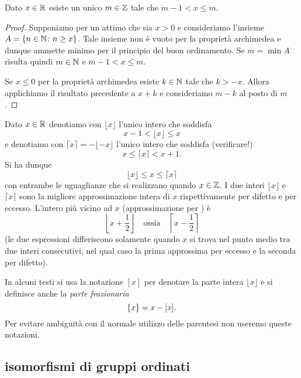 \begin{theorem}
\mymark{*}%
  Dato $x\in {\mathbb R}$ esiste un unico $m\in {\mathbb Z}$ tale che $m-1 < x \le m$.
\end{theorem}
%
\begin{proof}
  Supponiamo per un attimo che sia $x > 0$
  e consideriamo l'insieme $A={\left\{ n \in {\mathbb N} \colon n\ge x \right\}}$.
  Tale insieme non è vuoto per la proprietà archimedea 
  e dunque ammette minimo per il principio del buon ordinamento.
  Se $m=\min A$ risulta quindi $m\in {\mathbb N}$ e $m-1< x \le m$.

  Se $x\le 0$ per la proprietà archimedea esiste $k\in {\mathbb N}$ tale che 
  $k>-x$. Allora applichiamo il risultato precedente a $x+k$ e consideriamo 
  $m-k$ al posto di $m$.
\end{proof}

\begin{definition}
  \mymark{**}%
  Dato $x\in {\mathbb R}$ denotiamo con $\lfloor x\rfloor$ l'unico intero
  che soddisfa
  \mynote{$\lfloor\cdot\rfloor$} %
  \[
    x - 1 < \lfloor x \rfloor \le x
  \]
  e denotiamo con $\lceil x \rceil = - \lfloor -x \rfloor$ l'unico intero che soddisfa (verificare!)
  \mynote{$\lceil\cdot\rceil$} %
  \[
    x \le \lceil x \rceil < x + 1.
  \]
  Si ha dunque
  \[
    \lfloor x \rfloor \le x \le \lceil x \rceil
  \]
  con entrambe le uguaglianze che si realizzano quando $x\in {\mathbb Z}$.
  I due interi $\lfloor x \rfloor$ e $\lceil x \rceil$
  sono la migliore approssimazione intera di $x$ rispettivamente
  per difetto e per eccesso.
  L'intero più vicino ad $x$ (approssimazione per )
  è
  \[
    \left\lfloor x + \frac 1 2 \right\rfloor
  \quad \text{ossia} \quad
    \left\lceil x-\frac 1 2 \right\rceil
  \]
  (le due espressioni differiscono solamente quando $x$ si trova nel punto medio tra 
  due interi consecutivi, nel qual caso la prima approssima per eccesso e la seconda 
  per difetto).
\end{definition}

In alcuni testi si usa la notazione $[x]$ per denotare la parte intera $\lfloor x \rfloor$ e si definisce
anche la \emph{parte frazionaria}
\[
  {\left\{ x \right\}} = x - [x].
\]
Per evitare ambiguità con il normale utilizzo delle parentesi
non useremo queste notazioni.
  
\subsection{isomorfismi di gruppi ordinati}

